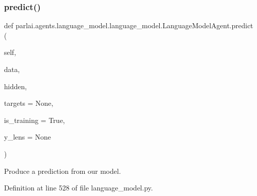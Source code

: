 \subsubsection{\texorpdfstring{predict()}{predict()}}
{\footnotesize\ttfamily def parlai.\+agents.\+language\+\_\+model.\+language\+\_\+model.\+Language\+Model\+Agent.\+predict (\begin{DoxyParamCaption}\item[{}]{self,  }\item[{}]{data,  }\item[{}]{hidden,  }\item[{}]{targets = {\ttfamily None},  }\item[{}]{is\+\_\+training = {\ttfamily True},  }\item[{}]{y\+\_\+lens = {\ttfamily None} }\end{DoxyParamCaption})}

\begin{DoxyVerb}Produce a prediction from our model.\end{DoxyVerb}
 

Definition at line 528 of file language\+\_\+model.\+py.



